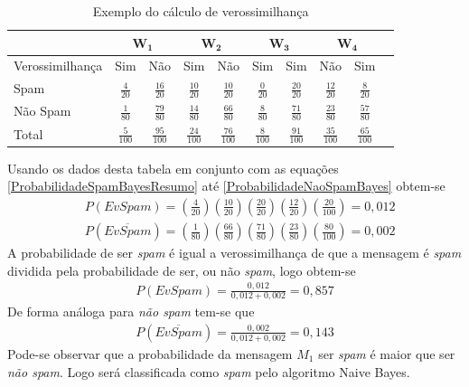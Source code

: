 \begin{table}[!htp]
\centering
\caption{Exemplo do cálculo de verossimilhança}
\begin{tabular}{lccccccccc}
\hline
\multicolumn{1}{c}{} & \multicolumn{2}{c}{$\mathbf{W_1}$} & \multicolumn{2}{c}{$\mathbf{W_2}$} & \multicolumn{2}{c}{$\mathbf{W_3}$} & \multicolumn{2}{c}{$\mathbf{W_4}$} \\ \hline
Verossimilhança  &   Sim &   Não   &     Sim       &      Não      &     Sim       &       Sim &      Não      &      Sim         \\  \hline  

Spam   &   \(\frac{4}{20}\) &   \(\frac{16}{20}\)   &     \(\frac{10}{20}\)       &      \(\frac{10}{20}\)      &     \(\frac{0}{20}\)       &       \(\frac{20}{20}\)     &      \(\frac{12}{20}\)      &      \(\frac{8}{20}\)          \\ [4pt]

Não Spam   &   \(\frac{1}{80}\) &   \(\frac{79}{80}\)   &     \(\frac{14}{80}\)       &      \(\frac{66}{80}\)      &     \(\frac{8}{80}\)       &       \(\frac{71}{80}\)     &      \(\frac{23}{80}\)      &      \(\frac{57}{80}\)         \\  [4pt]
 
Total  &   \(\frac{5}{100}\) &   \(\frac{95}{100}\)   &     \(\frac{24}{100}\)       &      \(\frac{76}{100}\)      &     \(\frac{8}{100}\)       &       \(\frac{91}{100}\)     &      \(\frac{35}{100}\)      &      \(\frac{65}{100}\)     \\  \hline
\end{tabular}
\vspace{0.1cm}
	\label{tab_verossimilhancasExemploNaiveBayes}
	\vspace{0.1cm}
\end{table}
\egroup
Usando os dados desta tabela em conjunto com as equações \eqref{ProbabilidadeSpamBayesResumo} até \eqref{ProbabilidadeNaoSpamBayes} obtem-se
\begin{align}
& P(EvSpam) = \left(\frac{4}{20}\right) \left(\frac{10}{20}\right) \left(\frac{20}{20}\right) \left(\frac{12}{20}\right) \left(\frac{20}{100}\right) = 0,012 \\
& P(\overline{EvSpam}) = \left(\frac{1}{80}\right) \left(\frac{66}{80}\right) \left(\frac{71}{80}\right) \left(\frac{23}{80}\right) \left(\frac{80}{100}\right) = 0,002
\end{align}
A probabilidade de ser \emph{spam} é igual a verossimilhança de que a mensagem é \emph{spam} dividida pela probabilidade de ser, ou não \emph{spam}, logo obtem-se
\begin{align}
P(EvSpam) = \frac{0,012}{0,012 + 0,002} = 0,857
\end{align}
De forma análoga para \emph{não spam} tem-se que
\begin{align}
P(\overline{EvSpam}) = \frac{0,002}{0,012 + 0,002} = 0,143 
\end{align}
Pode-se observar que a probabilidade da mensagem \(M_{1}\) ser \emph{spam} é maior que ser \emph{não spam}. Logo será classificada como \emph{spam} pelo algoritmo Naive Bayes.


